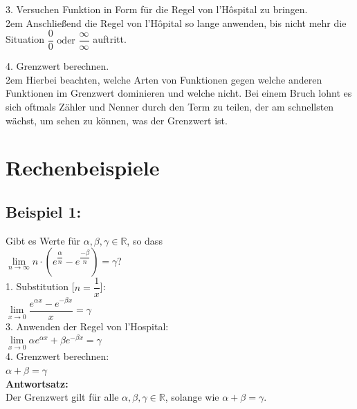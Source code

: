\documentclass[11pt,final]{scrreprt}
\newcommand{\br} {\medskip\\}
\newcommand{\R} {\mathbb R}
\begin{document}
3. Versuchen Funktion in Form für die Regel von l'Hôspital zu bringen.\\

\begingroup
\leftskip2em 
Anschließend die Regel von l'Hôpital so lange anwenden, bis nicht mehr die Situation $ \dfrac{0}{0} \text{ oder } \dfrac{\infty}{\infty} $ auftritt.\\
\par	
\endgroup 

4. Grenzwert berechnen.\\

\begingroup
\leftskip2em 
Hierbei beachten, welche Arten von Funktionen gegen welche anderen Funktionen im Grenzwert dominieren und welche nicht. Bei einem Bruch lohnt es sich oftmals Zähler und Nenner durch den Term zu teilen, der am schnellsten wächst, um sehen zu können, was der Grenzwert ist.\\
\par	
\endgroup 

\section{Rechenbeispiele}
\subsection*{Beispiel 1: }
Gibt es Werte für $\alpha, \beta, \gamma \in\R$, so dass \\
\hspace*{2em}$ \lim\limits_{n\to\infty} n\cdot\left( e^{\dfrac{\alpha}{n}}- e^{\dfrac{-\beta}{n}}\right) = \gamma $?\br
1. Substitution [$ n=\dfrac{1}{x} $]:\\
\hspace*{2em}$ \lim\limits_{x\to 0} \dfrac{e^{{\alpha}{x}}- e^{{-\beta}{x}}}{x} = \gamma $\br
3. Anwenden der Regel von l'Hospital:\\
\hspace*{2em}$ \lim\limits_{x\to 0} \alpha{e^{{\alpha}{x}}+\beta e^{{-\beta}{x}}} = \gamma $\br
4. Grenzwert berechnen:\\
\hspace*{2em}$ \alpha + \beta = \gamma $\br
\textbf{Antwortsatz:}\\
Der Grenzwert gilt für alle $\alpha, \beta, \gamma \in\R$, solange wie $ \alpha + \beta = \gamma $.
\end{document}
